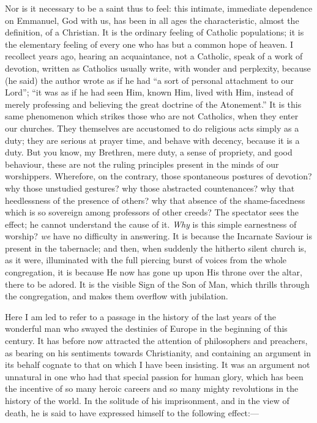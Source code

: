 Nor is it necessary to be a saint thus to feel: this
intimate, immediate dependence on Emmanuel, God with us,
has been in all ages the characteristic, almost the
definition, of a Christian. It is the ordinary feeling of
Catholic populations; it is the elementary feeling of
every one who has but a common hope of heaven. I
recollect years ago, hearing an acquaintance, not a
Catholic, speak of a work of devotion, written as
Catholics usually write, with wonder and perplexity,
because (he said) the author wrote as if he had ``a
sort of personal attachment to our Lord''; ``it
was as if he had seen Him, known Him, lived with Him,
instead of merely professing and believing the great
doctrine of the Atonement.'' It is this same
phenomenon which strikes those who are not Catholics,
when they enter our churches. They themselves are
accustomed to do religious acts simply as a duty; they
are serious at prayer time, and behave with decency,
because it is a duty. But you know, my Brethren, mere
duty, a sense of propriety, and good behaviour, these are
not the ruling principles present in the minds of our
worshippers. Wherefore, on the contrary, those
spontaneous postures of devotion? why those unstudied
gestures? why those abstracted countenances? why that
heedlessness of the presence of others? why that absence
of the shame-facedness which is so sovereign among
professors of other creeds? The spectator sees the
effect; he cannot understand the cause of it. \emph{Why}
is this simple earnestness of worship? \emph{we} have no
difficulty in answering. It is because the Incarnate
Saviour is present in the tabernacle; and then, when
suddenly the hitherto silent church is, as it were,
illuminated with the full piercing burst of voices from
the whole congregation, it is because He now has gone up
upon His throne over the altar, there to be adored. It is
the visible Sign of the Son of Man, which thrills through
the congregation, and makes them overflow with
jubilation.

Here I am led to refer to a passage in the history of
the last years of the wonderful man who swayed the
destinies of Europe in the beginning of this century. It
has before now attracted the attention of philosophers
and preachers, as bearing on his sentiments towards
Christianity, and containing an argument in its behalf
cognate to that on which I have been insisting. It was an
argument not unnatural in one who had that special
passion for human glory, which has been the incentive of
so many heroic careers and so many mighty revolutions in
the history of the world. In the solitude of his
imprisonment, and in the view of death, he is said to
have expressed himself to the following effect:—

